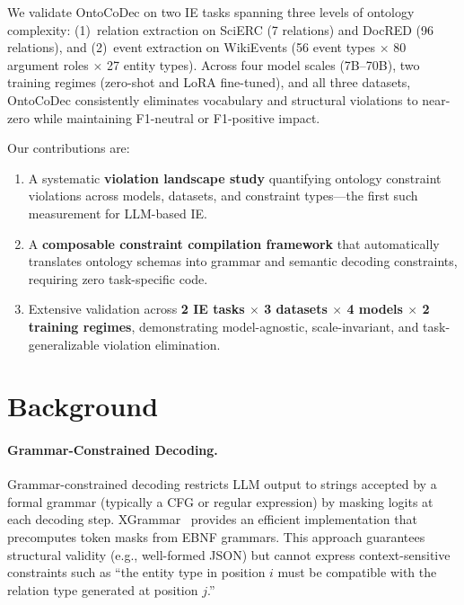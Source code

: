 \documentclass[11pt]{article}
\newcommand{\sys}{OntoCoDec}
\begin{document}
We validate \sys{} on two IE tasks spanning three levels of ontology complexity:
(1)~relation extraction on SciERC (7 relations) and DocRED (96 relations), and
(2)~event extraction on WikiEvents (56 event types $\times$ 80 argument roles $\times$ 27 entity types).
Across four model scales (7B--70B), two training regimes (zero-shot and LoRA fine-tuned), and all three datasets, \sys{} consistently eliminates vocabulary and structural violations to near-zero while maintaining F1-neutral or F1-positive impact.

Our contributions are:
\begin{enumerate}[nosep,leftmargin=*]
\item A systematic \textbf{violation landscape study} quantifying ontology constraint violations across models, datasets, and constraint types---the first such measurement for LLM-based IE.
\item A \textbf{composable constraint compilation framework} that automatically translates ontology schemas into grammar and semantic decoding constraints, requiring zero task-specific code.
\item Extensive validation across \textbf{2 IE tasks $\times$ 3 datasets $\times$ 4 models $\times$ 2 training regimes}, demonstrating model-agnostic, scale-invariant, and task-generalizable violation elimination.
\end{enumerate}

\section{Background}
\label{sec:background}

\paragraph{Grammar-Constrained Decoding.}
Grammar-constrained decoding restricts LLM output to strings accepted by a formal grammar (typically a CFG or regular expression) by masking logits at each decoding step.
XGrammar~\cite{dong2024xgrammar} provides an efficient implementation that precomputes token masks from EBNF grammars.
This approach guarantees structural validity (e.g., well-formed JSON) but cannot express context-sensitive constraints such as ``the entity type in position $i$ must be compatible with the relation type generated at position $j$.''
\end{document}
